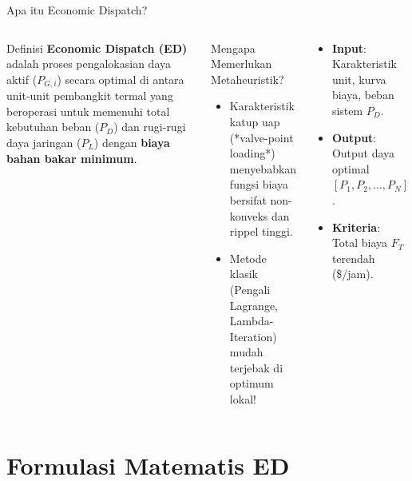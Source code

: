 \documentclass[10pt,aspectratio=169]{beamer}
\begin{document}
\begin{frame}{Apa itu Economic Dispatch?}
    \begin{columns}
        \begin{block}{Definisi}
            \textbf{Economic Dispatch (ED)} adalah proses pengalokasian daya aktif ($P_{G,i}$) secara optimal di antara unit-unit pembangkit termal yang beroperasi untuk memenuhi total kebutuhan beban ($P_D$) dan rugi-rugi daya jaringan ($P_L$) dengan \textbf{biaya bahan bakar minimum}.
        \end{block}
        \vspace{0.2cm}
        \begin{alertblock}{Mengapa Memerlukan Metaheuristik?}
            \begin{itemize}
                \item Karakteristik katup uap (*valve-point loading*) menyebabkan fungsi biaya bersifat non-konveks dan rippel tinggi.
                \item Metode klasik (Pengali Lagrange, Lambda-Iteration) mudah terjebak di optimum lokal!
            \end{itemize}
        \end{alertblock}

        \begin{tcolorbox}[colback=unibgold!10,colframe=unibgold!80!black,title=\textbf{Komponen Utama ED}]
            \begin{itemize}
                \item \textbf{Input}: Karakteristik unit, kurva biaya, beban sistem $P_D$.
                \item \textbf{Output}: Output daya optimal $[P_1, P_2, \dots, P_N]$.
                \item \textbf{Kriteria}: Total biaya $F_T$ terendah (\$/jam).
            \end{itemize}
        \end{tcolorbox}
    \end{columns}
\end{frame}

\section{Formulasi Matematis ED}
\end{document}
